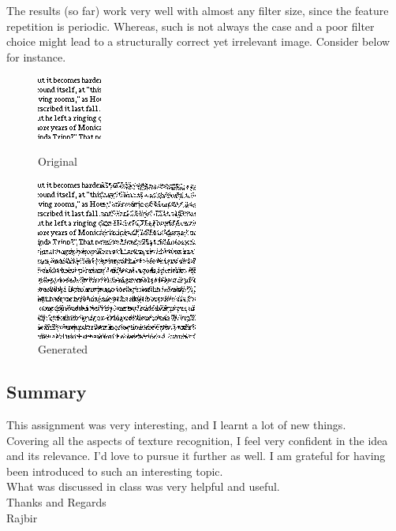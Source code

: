 \documentclass{article}
\begin{document}
The results (so far) work very well with almost any filter size, since the feature repetition is periodic. Whereas, such is not always the case and a poor filter choice might lead to a structurally correct yet irrelevant image. Consider below for instance.\\[5pt]

    \begin{figure}[!htb]
    \begin{center}
      \includegraphics[scale=.6]{5/report/non_parametric/5.png}
      \caption{Original}
    \end{center}
    \endminipage
    \begin{center}
      \includegraphics[scale=1.0]{5/report/non_parametric/5_created.png}
      \caption{Generated}
    \end{center}
    \endminipage
    \end{figure}
\pagebreak
\subsection*{Summary}
    This assignment was very interesting, and I learnt a lot of new things.\\
    Covering all the aspects of texture recognition, I feel very confident in the idea and its relevance. I'd love to pursue it further as well. I am grateful for having been introduced to such an interesting topic.\\
    What was discussed in class was very helpful and useful. \\
    Thanks and Regards\\
    Rajbir
\end{document}
